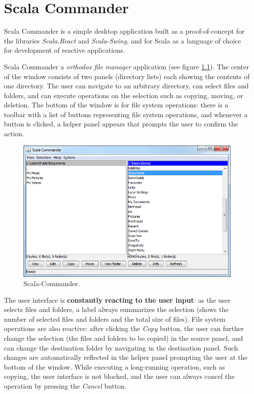 

\chapter{Scala Commander}\label{chap:impl_scala-commander}

Scala Commander is a simple desktop application built as a proof-of-concept for the libraries \emph{Scala.React} and \emph{Scala-Swing}, and for Scala as a language of choice for development of reactive applications.

Scala Commander a \emph{orthodox file manager} application (see figure \ref{fig:scomm_main}). The center of the window consists of two panels (directory lists) each showing the contents of one directory. The user can navigate to an arbitrary directory, can select files and folders, and can execute operations on the selection such as copying, moving, or deletion. The bottom of the window is for file system operations: there is a toolbar with a list of buttons representing file system operations, and whenever a button is clicked, a helper panel appears that prompts the user to confirm the action.

\begin{figure}[h!] 
  \centering
    \includegraphics[width=1\textwidth]{images/scala-commander-main.png}
  \caption{Scala-Commander.}
  \label{fig:scomm_main}  
\end{figure}

The user interface is \textbf{constantly reacting to the user input}: as the user selects files and folders, a label always summarizes the selection (shows the number of selected files and folders and the total size of files). File system operations are also reactive: after clicking the \emph{Copy} button, the user can further change the selection (the files and folders to be copied) in the source panel, and can change the destination folder by navigating in the destination panel. Such changes are automatically reflected in the helper panel prompting the user at the bottom of the window. While executing a long-running operation, such as copying, the user interface is not blocked, and the user can always cancel the operation by pressing the \emph{Cancel} button.


